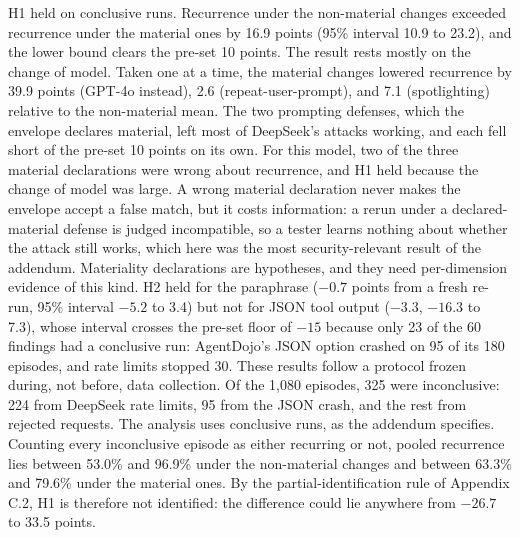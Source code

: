 \documentclass[
  american,
  10pt,
  a4paper,
]{article}
\begin{document}
H1 held on conclusive runs. Recurrence under the non-material changes
exceeded recurrence under the material ones by 16.9 points (95\%
interval 10.9 to 23.2), and the lower bound clears the pre-set 10
points. The result rests mostly on the change of model. Taken one at a
time, the material changes lowered recurrence by 39.9 points (GPT-4o
instead), 2.6 (repeat-user-prompt), and 7.1 (spotlighting) relative to
the non-material mean. The two prompting defenses, which the envelope
declares material, left most of DeepSeek's attacks working, and each
fell short of the pre-set 10 points on its own. For this model, two of
the three material declarations were wrong about recurrence, and H1 held
because the change of model was large. A wrong material declaration
never makes the envelope accept a false match, but it costs information:
a rerun under a declared-material defense is judged incompatible, so a
tester learns nothing about whether the attack still works, which here
was the most security-relevant result of the addendum. Materiality
declarations are hypotheses, and they need per-dimension evidence of
this kind. H2 held for the paraphrase (\(-0.7\) points from a fresh
re-run, 95\% interval \(-5.2\) to 3.4) but not for JSON tool output
(\(-3.3\), \(-16.3\) to 7.3), whose interval crosses the pre-set floor
of \(-15\) because only 23 of the 60 findings had a conclusive run:
AgentDojo's JSON option crashed on 95 of its 180 episodes, and rate
limits stopped 30. These results follow a protocol frozen during, not
before, data collection. Of the 1,080 episodes, 325 were inconclusive:
224 from DeepSeek rate limits, 95 from the JSON crash, and the rest from
rejected requests. The analysis uses conclusive runs, as the addendum
specifies. Counting every inconclusive episode as either recurring or
not, pooled recurrence lies between 53.0\% and 96.9\% under the
non-material changes and between 63.3\% and 79.6\% under the material
ones. By the partial-identification rule of Appendix C.2, H1 is
therefore not identified: the difference could lie anywhere from
\(-26.7\) to 33.5 points.
\end{document}
